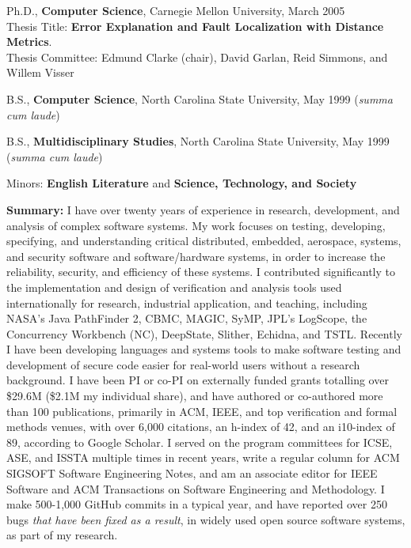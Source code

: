 \documentclass[ComputerScience]{vita}
\begin{document}
\begin{vita}


\begin{Education}
  \item Ph.D., {\bf Computer Science}, Carnegie Mellon University, March 2005\\ Thesis Title:  {\bf Error Explanation and Fault Localization with Distance Metrics}.\\Thesis Committee:  Edmund Clarke (chair), David Garlan, Reid Simmons, and Willem Visser

  \item B.S., {\bf Computer Science}, North Carolina State University, May 1999 (\emph{summa cum laude})
  \item B.S., {\bf Multidisciplinary Studies}, North Carolina State University, May 1999 (\emph{summa cum laude})
\item  \hspace{0.5in} Minors:  {\bf English Literature} and {\bf Science, Technology, and Society}
\end{Education}

\begin{Experience}
\item {\bf Summary:} I have over twenty years of experience in
  research, development, and analysis of complex software systems.  My
  work focuses on testing, developing, specifying, and understanding
  critical distributed, embedded, aerospace, systems, and security
  software and software/hardware systems, in order to increase the
  reliability, security, and efficiency of these systems.  I
  contributed significantly to the implementation and design of
  verification and analysis tools used internationally for research,
  industrial application, and teaching, including NASA's Java
  PathFinder 2, CBMC, MAGIC, SyMP, JPL's LogScope, the Concurrency
  Workbench (NC), DeepState, Slither, Echidna, and TSTL.  Recently I have been developing languages
  and systems tools to make software testing and development of secure
  code easier for real-world users without a research background.
  I have been PI or co-PI on externally funded grants totalling over
  \$29.6M (\$2.1M my individual share), and have authored or co-authored more than
  100 publications, primarily in ACM, IEEE, and top verification and
  formal methods venues, with over 6,000 citations, an h-index of 42,
  and an i10-index of 89, according to Google Scholar.  I served on
  the program committees for ICSE, ASE, and ISSTA multiple times in
  recent years, write a regular column for ACM SIGSOFT Software
  Engineering Notes, and am an associate editor for IEEE Software and ACM Transactions on Software Engineering and Methodology.  I make 500-1,000 GitHub commits in a typical
  year, and have reported over 250 bugs \emph{that have been fixed as a result}, in widely used open source
  software systems, as part of my research.


\end{Experience}
\end{vita}
\end{document}
